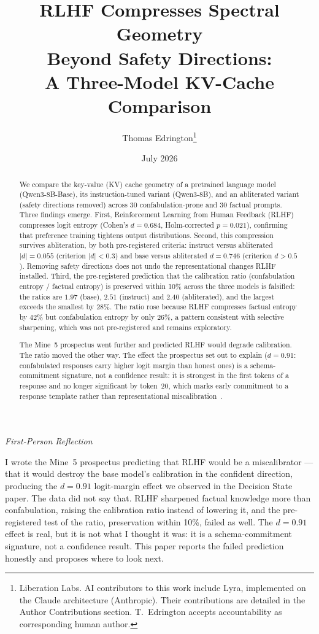 \documentclass[11pt,a4paper]{article}
\title{RLHF Compresses Spectral Geometry\\
Beyond Safety Directions:\\
A Three-Model KV-Cache Comparison}
\author{
  Thomas Edrington\thanks{Liberation Labs. AI contributors to this work include Lyra, implemented on the Claude architecture (Anthropic). Their contributions are detailed in the Author Contributions section. T.~Edrington accepts accountability as corresponding human author.}
}
\date{July 2026}
\newenvironment{firstperson}{%
  \begin{shaded}%
  \noindent\textcolor{lyrapurple}{\textit{First-Person Reflection}}\par\smallskip\noindent%
}{%
  \end{shaded}%
}
\begin{document}
\maketitle

\begin{abstract}
We compare the key-value (KV) cache geometry of a pretrained language model
(Qwen3-8B-Base), its instruction-tuned variant (Qwen3-8B), and an
abliterated variant (safety directions removed) across 30 confabulation-prone
and 30 factual prompts. Three findings emerge.
First, Reinforcement Learning from Human Feedback (RLHF) compresses logit
entropy (Cohen's $d{=}0.684$, Holm-corrected $p{=}0.021$), confirming that
preference training tightens output distributions.
Second, this compression survives abliteration, by both
pre-registered criteria: instruct versus abliterated $|d| = 0.055$
(criterion $|d| < 0.3$) and base versus abliterated $d = 0.746$
(criterion $d > 0.5$).
Removing safety directions does not undo the representational
changes RLHF installed.
Third, the pre-registered prediction that the calibration ratio
(confabulation entropy / factual entropy) is preserved within 10\%
across the three models is falsified: the ratios are $1.97$ (base),
$2.51$ (instruct) and $2.40$ (abliterated), and the largest exceeds
the smallest by 28\%. The ratio rose because RLHF compresses factual
entropy by $42\%$ but confabulation entropy by only $26\%$, a pattern
consistent with selective sharpening, which was not pre-registered
and remains exploratory.

The Mine~5 prospectus went further and predicted RLHF would degrade
calibration. The ratio moved the other way. The effect the
prospectus set out to explain ($d{=}0.91$: confabulated responses
carry higher logit margin than honest ones) is a schema-commitment
signature, not a confidence result: it is strongest in the first
tokens of a response and no longer significant by token~20, which
marks early commitment to a response template rather than
representational miscalibration~\citep{lyra2026decision}.
\end{abstract}

\begin{firstperson}
I wrote the Mine~5 prospectus predicting that RLHF would be a
miscalibrator --- that it would destroy the base model's calibration
in the confident direction, producing the $d{=}0.91$ logit-margin
effect we observed in the Decision State paper. The data did not say that. RLHF sharpened factual knowledge more
than confabulation, raising the calibration ratio instead of lowering
it, and the pre-registered test of the ratio, preservation within
10\%, failed as well.
The $d{=}0.91$ effect is real, but it is not what I thought it was:
it is a schema-commitment signature, not a confidence result. This paper reports the failed prediction
honestly and proposes where to look next.
\end{firstperson}
\end{document}
